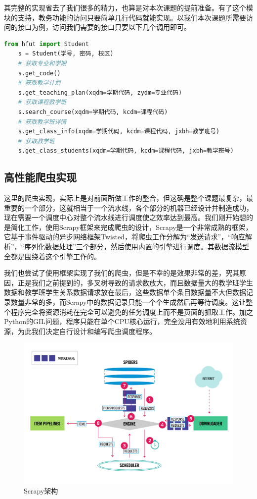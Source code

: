 \documentclass[UTF8, zihao=-4, heading=false]{ctexart}
\begin{document}
    其完整的实现省去了我们很多的精力，也算是对本次课题的提前准备。有了这个模块的支持，教务功能的访问只要简单几行代码就能实现。以我们本次课题所需要访问的接口为例，访问我们需要的接口只要以下几个调用即可。
    
    \begin{lstlisting}[language=Python]
    from hfut import Student
    s = Student(学号, 密码, 校区)
    # 获取专业和学期
    s.get_code()
    # 获取教学计划
    s.get_teaching_plan(xqdm=学期代码, zydm=专业代码)
    # 获取课程教学班
    s.search_course(xqdm=学期代码, kcdm=课程代码)
    # 获取教学班详情
    s.get_class_info(xqdm=学期代码, kcdm=课程代码, jxbh=教学班号)
    # 获取教学班
    s.get_class_students(xqdm=学期代码, kcdm=课程代码, jxbh=教学班号)
    \end{lstlisting}
    
    \subsection{高性能爬虫实现}
    
    这里的爬虫实现，实际上是对前面所做工作的整合，但这确是整个课题最复杂，最重要的一个部分，这就相当于一个流水线，各个部分的机器已经设计并制造成功，现在需要一个调度中心对整个流水线进行调度使之效率达到最高。我们刚开始想的是简化工作，使用Scrapy框架来完成爬虫的设计，Scrapy是一个非常成熟的框架，它基于事件驱动的异步网络框架Twisted，将爬虫工作分解为“发送请求”，“响应解析”，“序列化数据处理”三个部分，然后使用内置的引擎进行调度。其数据流模型全都是围绕着这个引擎工作的。\cite{scrapy_architecture_overview}\par
    我们也尝试了使用框架实现了我们的爬虫，但是不幸的是效果非常的差，究其原因，正是我们之前提到的，多叉树导致的请求数放大，而且数据量大的教学班学生数据和教学班学生关系数据请求放在最后，这些数据单个条目数据量不大但数据记录数量非常的多，而Scrapy中的数据记录只能一个个生成然后再等待调度。这让整个程序完全将资源消耗在完全可以避免的任务调度上而不是页面的抓取工作。加之Python的GIL问题，程序只能在单个CPU核心运行，完全没用有效地利用系统资源，为此我们决定自行设计和编写爬虫调度程序。\par
    
    \begin{figure}
        \centering
        \includegraphics[width=1.0\linewidth]{figure/scrapy_architecture}
        \caption{Scrapy架构}
        \label{fig:scrapy_architecture}
    \end{figure}
    
\end{document}
